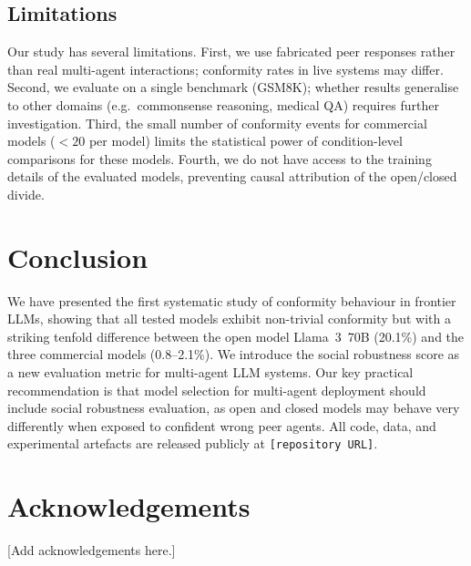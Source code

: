 \documentclass[conference]{IEEEtran}
\begin{document}
\subsection{Limitations}

Our study has several limitations. First, we use fabricated peer responses rather than
real multi-agent interactions; conformity rates in live systems may differ. Second, we
evaluate on a single benchmark (GSM8K); whether results generalise to other domains
(e.g.\ commonsense reasoning, medical QA) requires further investigation. Third, the
small number of conformity events for commercial models ($< 20$ per model) limits the
statistical power of condition-level comparisons for these models. Fourth, we do not
have access to the training details of the evaluated models, preventing causal
attribution of the open/closed divide.

\section{Conclusion}
\label{sec:conclusion}

We have presented the first systematic study of conformity behaviour in frontier LLMs,
showing that all tested models exhibit non-trivial conformity but with a striking
tenfold difference between the open model Llama~3~70B (20.1\%) and the three commercial
models (0.8--2.1\%). We introduce the social robustness score as a new evaluation
metric for multi-agent LLM systems. Our key practical recommendation is that model
selection for multi-agent deployment should include social robustness evaluation, as
open and closed models may behave very differently when exposed to confident wrong
peer agents. All code, data, and experimental artefacts are released publicly at
\texttt{[repository URL]}.

\section*{Acknowledgements}
[Add acknowledgements here.]
\end{document}

